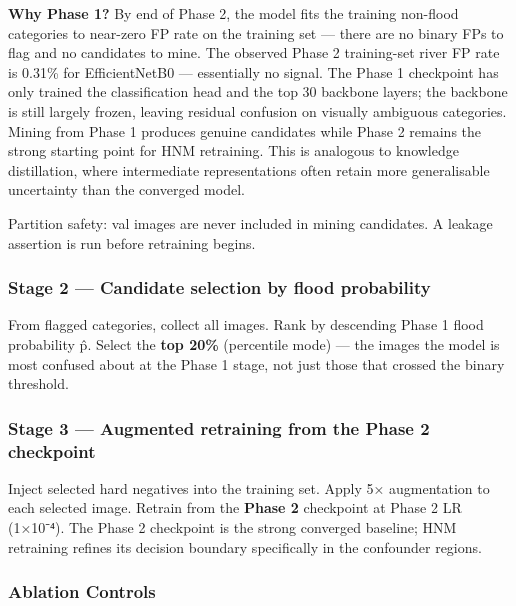 \documentclass[
  11pt,
]{article}
\begin{document}
\textbf{Why Phase 1?} By end of Phase 2, the model fits the training
non-flood categories to near-zero FP rate on the training set --- there
are no binary FPs to flag and no candidates to mine. The observed Phase
2 training-set river FP rate is 0.31\% for EfficientNetB0 ---
essentially no signal. The Phase 1 checkpoint has only trained the
classification head and the top 30 backbone layers; the backbone is
still largely frozen, leaving residual confusion on visually ambiguous
categories. Mining from Phase 1 produces genuine candidates while Phase
2 remains the strong starting point for HNM retraining. This is
analogous to knowledge distillation, where intermediate representations
often retain more generalisable uncertainty than the converged model.

Partition safety: val images are never included in mining candidates. A
leakage assertion is run before retraining begins.

\subsubsection{Stage 2 --- Candidate selection by flood
probability}\label{stage-2-candidate-selection-by-flood-probability}

From flagged categories, collect all images. Rank by descending Phase 1
flood probability p̂. Select the \textbf{top 20\%} (percentile mode) ---
the images the model is most confused about at the Phase 1 stage, not
just those that crossed the binary threshold.

\subsubsection{Stage 3 --- Augmented retraining from the Phase 2
checkpoint}\label{stage-3-augmented-retraining-from-the-phase-2-checkpoint}

Inject selected hard negatives into the training set. Apply 5×
augmentation to each selected image. Retrain from the \textbf{Phase 2}
checkpoint at Phase 2 LR (1×10⁻⁴). The Phase 2 checkpoint is the strong
converged baseline; HNM retraining refines its decision boundary
specifically in the confounder regions.

\subsubsection{Ablation Controls}\label{ablation-controls}
\end{document}
